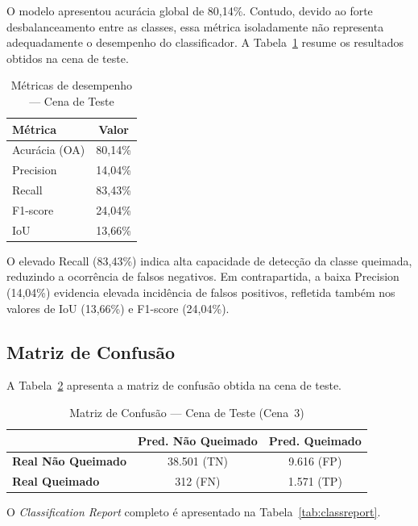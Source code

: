 \documentclass[conference]{IEEEtran}
\begin{document}
O modelo apresentou acurácia global de 80,14\%. Contudo, devido ao forte
desbalanceamento entre as classes, essa métrica isoladamente não representa
adequadamente o desempenho do classificador. A Tabela~\ref{tab:metrics}
resume os resultados obtidos na cena de teste.

\begin{table}[!t]
  \caption{Métricas de desempenho — Cena de Teste}
  \label{tab:metrics}
  \centering
  \begin{tabular}{lc}
    \toprule
    \textbf{Métrica} & \textbf{Valor} \\
    \midrule
    Acurácia (OA)    & 80,14\% \\
    Precision        & 14,04\% \\
    Recall           & 83,43\% \\
    F1-score         & 24,04\% \\
    IoU              & 13,66\% \\
    \bottomrule
  \end{tabular}
\end{table}

O elevado Recall (83,43\%) indica alta capacidade de detecção da classe
queimada, reduzindo a ocorrência de falsos negativos. Em contrapartida, a
baixa Precision (14,04\%) evidencia elevada incidência de falsos positivos,
refletida também nos valores de IoU (13,66\%) e F1-score (24,04\%).

\subsection{Matriz de Confusão}

A Tabela~\ref{tab:cm} apresenta a matriz de confusão obtida na cena de teste.

\begin{table}[!t]
  \caption{Matriz de Confusão — Cena de Teste (Cena~3)}
  \label{tab:cm}
  \centering
  \begin{tabular}{lcc}
    \toprule
    & \textbf{Pred. Não Queimado} & \textbf{Pred. Queimado} \\
    \midrule
    \textbf{Real Não Queimado} & 38.501 (TN) & 9.616 (FP) \\
    \textbf{Real Queimado}     &    312 (FN) & 1.571 (TP) \\
    \bottomrule
  \end{tabular}
\end{table}

O \textit{Classification Report} completo é apresentado na
Tabela~\ref{tab:classreport}.
\end{document}
